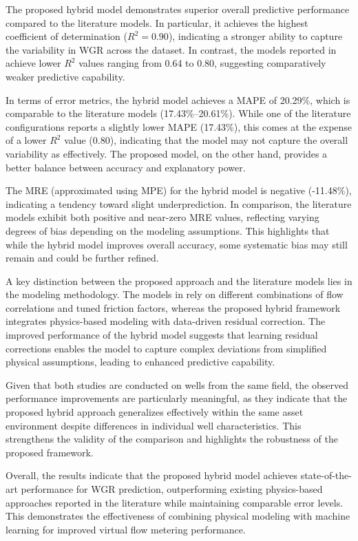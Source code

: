 \documentclass[12pt,APA]{uomthesis}
\begin{document}
The proposed hybrid model demonstrates superior overall predictive performance compared to the literature models. In particular, it achieves the highest coefficient of determination ($R^2 = 0.90$), indicating a stronger ability to capture the variability in WGR across the dataset. In contrast, the models reported in \citep{nemoto2023cloud} achieve lower $R^2$ values ranging from 0.64 to 0.80, suggesting comparatively weaker predictive capability.

In terms of error metrics, the hybrid model achieves a MAPE of 20.29\%, which is comparable to the literature models (17.43\%--20.61\%). While one of the literature configurations reports a slightly lower MAPE (17.43\%), this comes at the expense of a lower $R^2$ value (0.80), indicating that the model may not capture the overall variability as effectively. The proposed model, on the other hand, provides a better balance between accuracy and explanatory power.

The MRE (approximated using MPE) for the hybrid model is negative (-11.48\%), indicating a tendency toward slight underprediction. In comparison, the literature models exhibit both positive and near-zero MRE values, reflecting varying degrees of bias depending on the modeling assumptions. This highlights that while the hybrid model improves overall accuracy, some systematic bias may still remain and could be further refined.

A key distinction between the proposed approach and the literature models lies in the modeling methodology. The models in \citep{nemoto2023cloud} rely on different combinations of flow correlations and tuned friction factors, whereas the proposed hybrid framework integrates physics-based modeling with data-driven residual correction. The improved performance of the hybrid model suggests that learning residual corrections enables the model to capture complex deviations from simplified physical assumptions, leading to enhanced predictive capability.

Given that both studies are conducted on wells from the same field, the observed performance improvements are particularly meaningful, as they indicate that the proposed hybrid approach generalizes effectively within the same asset environment despite differences in individual well characteristics. This strengthens the validity of the comparison and highlights the robustness of the proposed framework.

Overall, the results indicate that the proposed hybrid model achieves state-of-the-art performance for WGR prediction, outperforming existing physics-based approaches reported in the literature while maintaining comparable error levels. This demonstrates the effectiveness of combining physical modeling with machine learning for improved virtual flow metering performance.
\end{document}
